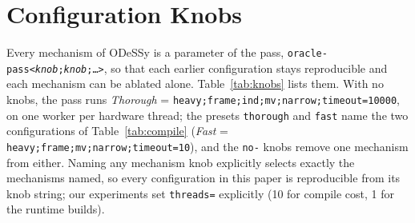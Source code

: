 \documentclass[acmsmall,screen,nonacm]{acmart}
\newcommand{\odessy}{ODeSSy}
\newcommand{\tool}{\odessy}
\begin{document}
\section{Configuration Knobs}
\label{sec:app-knobs}
Every mechanism of \tool{} is a parameter of the pass,
\texttt{oracle-pass<\emph{knob};\emph{knob};\ldots>}, so that each
earlier configuration stays reproducible and each mechanism can be
ablated alone. Table~\ref{tab:knobs} lists them. With no knobs, the pass
runs \emph{Thorough} = \texttt{heavy;frame;ind;mv;narrow;timeout=10000},
on one worker per hardware thread; the presets \texttt{thorough} and
\texttt{fast} name the two configurations of Table~\ref{tab:compile}
(\emph{Fast} = \texttt{heavy;frame;mv;narrow;timeout=10}), and the
\texttt{no-} knobs remove one mechanism from either. Naming any mechanism
knob explicitly selects exactly the mechanisms named, so every
configuration in this paper is reproducible from its knob string; our
experiments set \texttt{threads=} explicitly (10 for compile cost, 1 for
the runtime builds).
\end{document}

